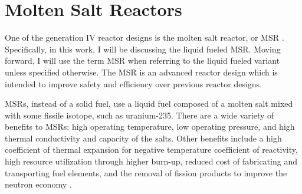\renewcommand*\descriptionlabel[1]{\hspace\leftmargin$#1$}
\setcounter{tocdepth}{5}
\setcounter{secnumdepth}{5}


\section{Molten Salt Reactors}

One of the generation IV reactor designs is the molten salt reactor, or MSR \cite{kelly_generation_2014}.
Specifically, in this work, I will be discussing the liquid fueled MSR.
Moving forward, I will use the term MSR when referring to the liquid fueled variant unless specified otherwise.
The MSR is an advanced reactor design which is intended to improve safety and efficiency over previous reactor designs.




MSRs, instead of a solid fuel, use a liquid fuel composed of a molten salt mixed with some fissile isotope, such as uranium-235.
There are a wide variety of benefits to MSRs: high operating temperature, low operating pressure, and high thermal conductivity and capacity of the salts.
Other benefits include a high coefficient of thermal expansion for negative temperature coefficient of reactivity, high resource utilization through higher burn-up, reduced cost of fabricating and transporting fuel elements, and the removal of fission products to improve the neutron economy \cite{serp_molten_2014}.

